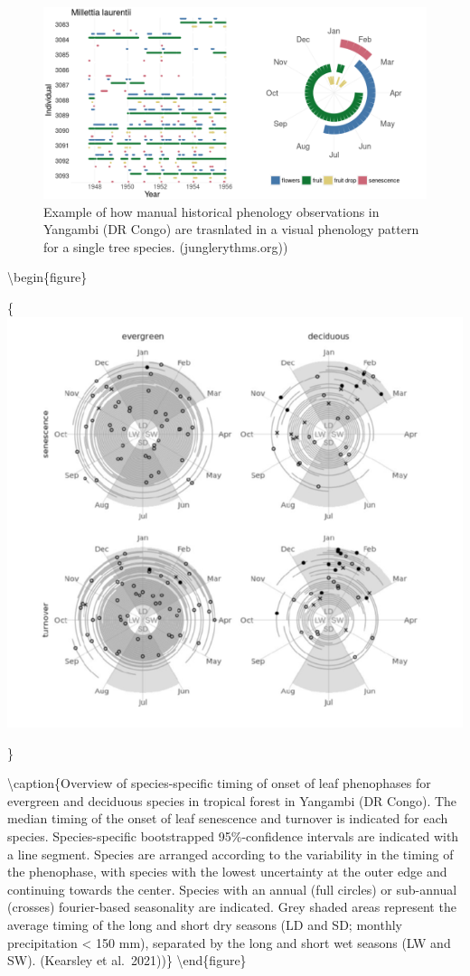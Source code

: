 \documentclass[
  12pt,
  oneside]{book}
\begin{document}
\begin{figure}

{\centering \includegraphics[width=0.8\linewidth]{figures/chap4/f49_junglerythms} 

}

\caption{Example of how manual historical phenology observations in Yangambi (DR Congo) are trasnlated in a visual phenology pattern for a single tree species. (junglerythms.org))}\label{fig:f47}
\end{figure}

\textbackslash begin\{figure\}

\{\centering \includegraphics[width=0.8\linewidth]{figures/chap4/f410_kearsley}

\}

\textbackslash caption\{Overview of species-specific timing of onset of leaf phenophases for evergreen and deciduous species in tropical forest in Yangambi (DR Congo). The median timing of the onset of leaf senescence and turnover is indicated for each species. Species-specific bootstrapped 95\%-confidence intervals are indicated with a line segment. Species are arranged according to the variability in the timing of the phenophase, with species with the lowest uncertainty at the outer edge and continuing towards the center. Species with an annual (full circles) or sub-annual (crosses) fourier-based seasonality are indicated. Grey shaded areas represent the average timing of the long and short dry seasons (LD and SD; monthly precipitation \textless{} 150 mm), separated by the long and short wet seasons (LW and SW). (Kearsley et al.~2021))\}\label{fig:f48}
\textbackslash end\{figure\}
\end{document}
